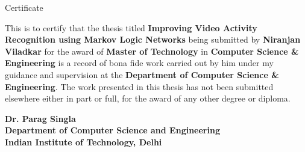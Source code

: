 \begin{center}
\LARGE{ Certificate} 
\end{center}

\vspace{0.5in}

This is to certify that the thesis titled {\bfseries Improving Video Activity Recognition using Markov Logic Networks} being submitted by
{\bfseries Niranjan Viladkar} for the award of {\bfseries Master of Technology} in {\bfseries Computer Science \& Engineering} 
is a record of bona fide work carried out by him under my guidance and supervision at the {\bfseries Department of Computer Science \& Engineering}. 
The work presented in this thesis has not been submitted elsewhere either in part or full, for the award of any other degree or diploma.

\vspace{1.5in}


{\bfseries Dr. Parag Singla} \\
{\bfseries Department of Computer Science and Engineering} \\
{\bfseries Indian Institute of Technology, Delhi}\\ 
